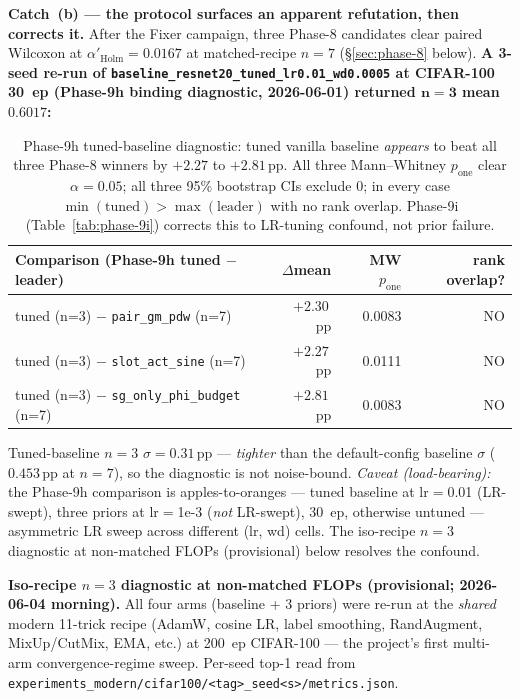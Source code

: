 \documentclass{article}
\begin{document}
\textbf{Catch~(b) --- the protocol surfaces an apparent refutation,
then corrects it.} After the Fixer campaign, three Phase-8 candidates
clear paired Wilcoxon at $\alpha'_{\mathrm{Holm}}{=}0.0167$ at
matched-recipe $n{=}7$ (\S\ref{sec:phase-8} below). \textbf{A 3-seed
re-run of \texttt{baseline\_resnet20\_tuned\_lr0.01\_wd0.0005} at
CIFAR-100 30~ep (Phase-9h binding diagnostic, 2026-06-01) returned
$\mathbf{n{=}3}$ mean $\mathbf{0.6017}$:}

\begin{table}[t]
\small\centering
\caption{Phase-9h tuned-baseline diagnostic: tuned vanilla baseline
\emph{appears} to beat all three Phase-8 winners by $+2.27$ to
$+2.81$\,pp. All three Mann--Whitney $p_{\mathrm{one}}$ clear
$\alpha{=}0.05$; all three 95\% bootstrap CIs exclude 0; in every case
$\min(\mathrm{tuned}) > \max(\mathrm{leader})$ with no rank overlap.
Phase-9i (Table~\ref{tab:phase-9i}) corrects this to LR-tuning
confound, not prior failure.}
\label{tab:phase-9h}
\begin{tabular}{l r r r}
\toprule
Comparison (Phase-9h tuned $-$ leader) & $\Delta$mean & MW $p_{\mathrm{one}}$ & rank overlap? \\
\midrule
tuned (n=3) $-$ \texttt{pair\_gm\_pdw} (n=7) & $+2.30$\,pp & 0.0083 & NO \\
tuned (n=3) $-$ \texttt{slot\_act\_sine} (n=7) & $+2.27$\,pp & 0.0111 & NO \\
tuned (n=3) $-$ \texttt{sg\_only\_phi\_budget} (n=7) & $+2.81$\,pp & 0.0083 & NO \\
\bottomrule
\end{tabular}
\end{table}

Tuned-baseline $n{=}3$ $\sigma = 0.31$\,pp --- \emph{tighter} than the
default-config baseline $\sigma$ ($0.453$\,pp at $n{=}7$), so the
diagnostic is not noise-bound. \emph{Caveat (load-bearing):} the
Phase-9h comparison is apples-to-oranges --- tuned baseline at
lr$=$0.01 (LR-swept), three priors at lr$=$1e-3 (\emph{not}
LR-swept), 30~ep, otherwise untuned --- asymmetric LR sweep across
different (lr, wd) cells. The iso-recipe $n{=}3$ diagnostic at
non-matched FLOPs (provisional) below resolves the confound.

\textbf{Iso-recipe $n{=}3$ diagnostic at non-matched FLOPs (provisional;
2026-06-04 morning).} All four arms (baseline + 3
priors) were re-run at the \emph{shared} modern 11-trick recipe
(AdamW, cosine LR, label smoothing, RandAugment, MixUp/CutMix, EMA,
etc.) at 200~ep CIFAR-100 --- the project's first multi-arm
convergence-regime sweep. Per-seed top-1 read from
\texttt{experiments\_modern/cifar100/<tag>\_seed<s>/metrics.json}.
\end{document}
